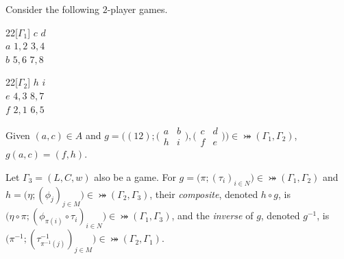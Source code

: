 	\begin{example} \label{egisomgames}
		Consider the following $2$-player games.            
        \begin{center}
            \begin{game}{2}{2}[$\Gamma_1$]
                        \> $c$  \> $d$ \\
                $a$   \> $1,2$  \> $3,4$ \\
                $b$   \> $5,6$  \> $7,8$
            \end{game}
            \hspace*{10mm} 
            \begin{game}{2}{2}[$\Gamma_2$]
                        \> $h$ \> $i$ \\
                $e$   \> $4,3$ \> $8,7$ \\
                $f$   \> $2,1$ \> $6,5$ \\
            \end{game} 
        \end{center}
        
		Given $(a, c) \in A$ and $g = \bigl((12) ; \bigl(\begin{smallmatrix} a & b \\ h & i \end{smallmatrix}\bigr), \bigl(\begin{smallmatrix} c & d \\ f & e \end{smallmatrix}\bigr)\bigr) \in \bij(\Gamma_1, \Gamma_2)$, $g(a,c) = (f,h)$.
	\end{example}
        
	Let $\Gamma_3 = (L, C, w)$ also be a game. For $g = \bigl(\pi; (\tau_i)_{i \in N}\bigr) \in \bij(\Gamma_1, \Gamma_2)$ and $h = \bigl(\eta; (\phi_j)_{j \in M}\bigr) \in \bij(\Gamma_2, \Gamma_3)$, their \textit{composite}, denoted $h\circ g$, is $\bigl(\eta\circ\pi; (\phi_{\pi(i)}\circ\tau_i)_{i \in N}\bigr) \in \bij(\Gamma_1, \Gamma_3)$, and the \textit{inverse} of $g$, denoted $g^{-1}$, is $\bigl(\pi^{-1}; (\tau^{-1}_{\pi^{-1}(j)})_{j \in M}\bigr) \in \bij(\Gamma_2, \Gamma_1)$.   
   	
